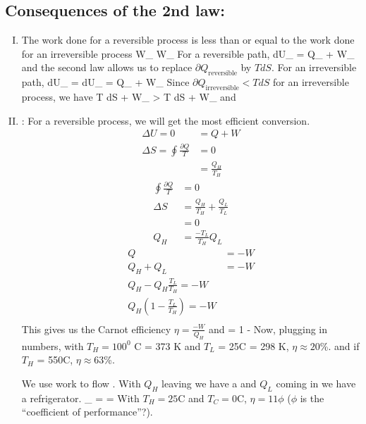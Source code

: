 \documentclass[12pt]{article}
\begin{document}
\subsection{Consequences of the 2nd law:}
\begin{enumerate}[(I)]
\item The work done for a reversible process is less than or equal to the work done for an irreversible process
\beq \partial W_ \leq \partial W_ \ceq
For a reversible path, \beq dU_ = \partial Q_ + \partial W_ \ceq
and the second law allows us to replace $\partial Q_\text{reversible}$ by $TdS$.  For an irreversible path,
\beq dU_ = dU_ = \partial Q_ + \partial W_ \ceq
Since $\partial Q_\text{irreversible} < T dS$ for an irreversible process, we have
\beq T dS + \partial W_ > T dS + \partial W_
\ceq
and 
\beq {}
\ceq
\item {}: For a reversible process, we will get the most efficient conversion.
\begin{align*}
\Delta U = 0 &= Q + W\\
\Delta S = \oint \frac{\partial Q}{T}& = 0\\
&= \frac{Q_H}{T_H}
\end{align*}
\begin{align*}
\oint \frac{\partial Q}{T} &= 0\\
\Delta S &= \frac{Q_H}{T_H} + \frac{Q_L}{T_L}\\
&= 0\\
Q_H &= \frac{-T_L}{T_H} Q_L
\end{align*}
\begin{align*}
Q &= -W\\
Q_H + Q_L &= -W\\
Q_H - Q_H \frac{T_L}{T_H} = -W\\
Q_H (1 - \frac{T_L}{T_H}) = -W\\
\end{align*}
This gives us the Carnot efficiency $\eta = \frac{-W}{Q_H}$ and \beq \eta = 1 -  \ceq  Now, plugging in numbers, with $T_H = 100^0$ C = 373 K and $T_L$ = 25\degree C = 298 K, $\eta \approx 20$\%. and if $T_H$ = 550\degree C, $\eta \approx 63$\%.

We use work to flow .  With $Q_H$ leaving we have a  and $Q_L$ coming in we have a refrigerator.
\beq \eta_ =  =  \ceq
With $T_H = 25$C and $T_C = 0$C, $\eta = 11\phi$ ($\phi$ is the ``coefficient of performance''?).
\end{enumerate}
\end{document}
